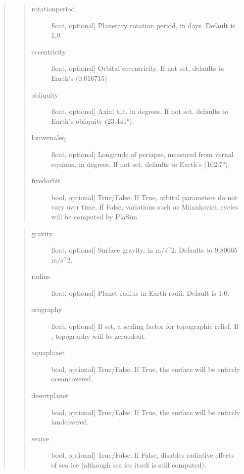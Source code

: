 \documentclass[letterpaper,10pt,english]{sphinxmanual}
\begin{document}
\begin{fulllineitems}
\begin{fulllineitems}
\begin{quote}
\begin{quote}
\begin{description}
\item[{rotationperiod}] \leavevmode{[}float, optional{]}
Planetary rotation period, in days. Default is 1.0.

\item[{eccentricity}] \leavevmode{[}float, optional{]}
Orbital eccentricity. If not set, defaults to Earth’s (0.016715)

\item[{obliquity}] \leavevmode{[}float, optional{]}
Axial tilt, in degrees. If not set, defaults to Earth’s obliquity (23.441°).

\item[{lonvernaleq}] \leavevmode{[}float, optional{]}
Longitude of periapse, measured from vernal equinox, in degrees. If
not set, defaults to Earth’s (102.7°).

\item[{fixedorbit}] \leavevmode{[}bool, optional{]}
True/False. If True, orbital parameters do not vary over time. If False,
variations such as Milankovich cycles will be computed by PlaSim.

\end{description}
\end{quote}

\begin{quote}
\begin{description}
\item[{gravity}] \leavevmode{[}float, optional{]}
Surface gravity, in m/s\textasciicircum{}2. Defaults to 9.80665 m/s\textasciicircum{}2.

\item[{radius}] \leavevmode{[}float, optional{]}
Planet radius in Earth radii. Default is 1.0.

\item[{orography}] \leavevmode{[}float, optional{]}
If set, a scaling factor for topographic relief. If , topography
will be zeroed\sphinxhyphen{}out.

\item[{aquaplanet}] \leavevmode{[}bool, optional{]}
True/False. If True, the surface will be entirely ocean\sphinxhyphen{}covered.

\item[{desertplanet}] \leavevmode{[}bool, optional{]}
True/False. If True, the surface will be entirely land\sphinxhyphen{}covered.

\item[{seaice}] \leavevmode{[}bool, optional{]}
True/False. If False, disables radiative effects of sea ice (although sea ice
itself is still computed).


\end{description}
\end{quote}
\end{quote}
\end{fulllineitems}
\end{fulllineitems}
\end{document}
